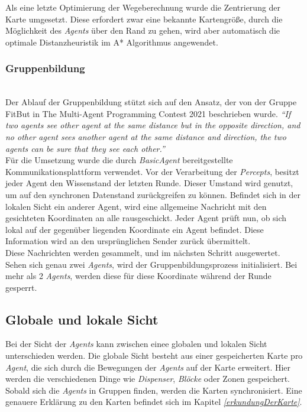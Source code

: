 Als eine letzte Optimierung der Wegeberechnung wurde die Zentrierung der Karte umgesetzt. Diese erfordert zwar eine bekannte Kartengröße, durch die Möglichkeit des \textit{Agents} über den Rand zu gehen, wird aber automatisch die optimale Distanzheuristik im A* Algorithmus angewendet.



\subsubsection{Gruppenbildung} \label{kap:Gruppenbildung} ~\\
Der Ablauf der Gruppenbildung stützt sich auf den Ansatz, der von der Gruppe FitBut in \glqq{}The Multi-Agent Programming Contest 2021\grqq{} beschrieben wurde. \textit{ “If two agents see other agent at the same distance but in the opposite direction, and no other agent sees another agent at the same distance and direction, the two agents can be sure that they see each other.”}\cite{ref_book1}  \\

Für die Umsetzung wurde die durch \textit{BasicAgent}  bereitgestellte Kommunikationsplattform verwendet. Vor der Verarbeitung der \textit{Percepts}, besitzt jeder Agent den Wissenstand der letzten Runde. Dieser Umstand wird genutzt, um auf den synchronen Datenstand zurückgreifen zu können. Befindet sich in der lokalen Sicht ein anderer Agent, wird eine allgemeine Nachricht mit den gesichteten Koordinaten an alle rausgeschickt. Jeder Agent prüft nun, ob sich lokal auf der gegenüber liegenden Koordinate ein Agent befindet. Diese Information wird an den ursprünglichen Sender zurück übermittelt.  \\

Diese Nachrichten werden gesammelt, und im nächsten Schritt ausgewertet. Sehen sich genau zwei \textit{Agents}, wird der Gruppenbildungsprozess initialisiert. Bei mehr als 2 \textit{Agents}, werden diese für diese Koordinate während der Runde gesperrt. \\


\subsection{Globale und lokale Sicht} \label{kap:lokaleSicht}
Bei der Sicht der \textit{Agents} kann zwischen einee globalen und lokalen Sicht unterschieden werden. Die globale Sicht besteht aus einer gespeicherten Karte pro \textit{Agent}, die sich durch die Bewegungen der \textit{Agents} auf der Karte erweitert. Hier werden die verschiedenen Dinge wie \textit{Dispenser}, \textit{Blöcke} oder Zonen gespeichert. Sobald sich die \textit{Agents} in Gruppen finden, werden die Karten synchronisiert. Eine genauere Erklärung zu den Karten befindet sich im Kapitel \textit{\ref{erkundungDerKarte}}.

